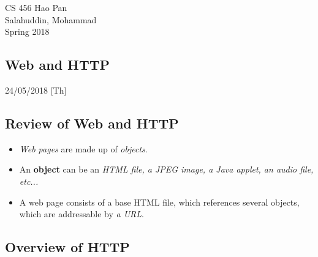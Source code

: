 \documentclass{article}
\begin{document}
\noindent
{CS 456 \hfill Hao Pan}\\
{Salahuddin, Mohammad}\\
{Spring 2018}


\begin{center}
\section{Web and HTTP}
\noindent
{\hfill 24/05/2018 [Th]}
\end{center}

\subsection{Review of Web and HTTP}

\begin{itemize}
\item {\it Web pages} are made up of {\it objects}.
\item An {\bf object} can be an {\it HTML file, a JPEG image, a Java applet, an audio file, etc...}
\item A web page consists of a base HTML file, which references several objects, which are addressable by {\it a URL}.
\end{itemize}

\subsection{Overview of HTTP}
\end{document}
